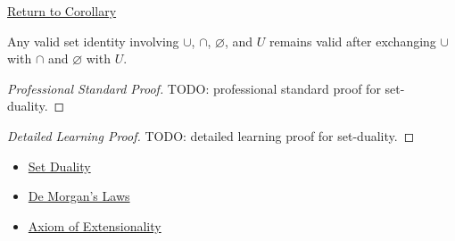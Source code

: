 \newpage
{}
\label{prf:set-duality}

\begin{remark*}[Return]
\hyperref[cor:set-duality]{Return to Corollary}
\end{remark*}

\begin{corollary*}
Any valid set identity involving $\cup$, $\cap$, $\varnothing$, and $U$
remains valid after exchanging $\cup$ with $\cap$ and $\varnothing$ with $U$.
\end{corollary*}

\begin{proof}[Professional Standard Proof]
\LRAProofBodyStart
TODO: professional standard proof for set-duality.
\end{proof}

\begin{proof}[Detailed Learning Proof]
\LRAProofBodyStart
TODO: detailed learning proof for set-duality.
\end{proof}

\begin{remark*}
\end{remark*}

\begin{dependencies}
\begin{itemize}
  \item \hyperref[def:set-duality]{Set Duality}
  \item \hyperref[thm:de-morgan]{De Morgan's Laws}
  \item \hyperref[ax:extensionality]{Axiom of Extensionality}
\end{itemize}
\end{dependencies}

\clearpage
